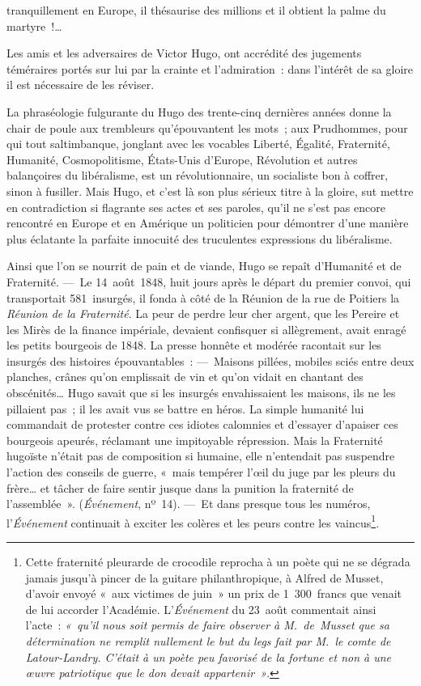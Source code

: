 \documentclass[french,twoside]{book} %
\begin{document}
\label{p39}tranquillement en Europe, il thésaurise des millions et il obtient la palme du martyre !…\par
Les amis et les adversaires de Victor Hugo, ont accrédité des jugements téméraires portés sur lui par la crainte et l’admiration : dans l’intérêt de sa gloire il est nécessaire de les réviser.\par
La phraséologie fulgurante du Hugo des trente-cinq dernières années donne la chair de poule aux trembleurs qu’épouvantent les mots ; aux Prudhommes, pour qui tout saltimbanque, jonglant avec les vocables Liberté, Égalité, Fraternité, Humanité, Cosmopolitisme, États-Unis d’Europe, Révolution et autres balançoires du libéralisme, est un révolutionnaire, un socialiste bon à coffrer, sinon à fusiller. Mais Hugo, et c’est là son plus sérieux titre à la gloire, sut mettre en contradiction si flagrante ses actes et ses paroles, qu’il ne s’est pas encore rencontré en Europe et en Amérique un politicien pour démontrer d’une manière plus éclatante la parfaite innocuité des truculentes expressions du libéralisme.\par
Ainsi que l’on se nourrit de pain et de viande, Hugo se repaît d’Humanité et de Fraternité. — Le 14 août 1848, huit jours après le départ du premier convoi, qui transportait 581 insurgés, il fonda à côté de la Réunion de la rue de Poitiers la {\itshape Réunion de la Fraternité}. La peur de perdre leur cher argent, que les Pereire et les Mirès de la finance impériale, devaient confisquer si allègrement, avait enragé les petits bourgeois de 1848. La presse honnête et modérée racontait sur les insurgés des histoires épouvantables : — Maisons pillées, mobiles sciés entre deux planches, crânes qu’on emplissait de vin  
\label{p40}et qu’on vidait en chantant des obscénités… Hugo savait que si les insurgés envahissaient les maisons, ils ne les pillaient pas ; il les avait vus se battre en héros. La simple humanité lui commandait de protester contre ces idiotes calomnies et d’essayer d’apaiser ces bourgeois apeurés, réclamant une impitoyable répression. Mais la Fraternité hugoïste n’était pas de composition si humaine, elle n’entendait pas suspendre l’action des conseils de guerre, « mais tempérer l’œil du juge par les pleurs du frère… et tâcher de faire sentir jusque dans la punition la fraternité de l’assemblée ». (\emph{Événement}, nº 14). — Et dans presque tous les numéros, l’\emph{Événement} continuait à exciter les colères et les peurs contre les vaincus\footnote{Cette fraternité pleurarde de crocodile reprocha à un poète qui ne se dégrada jamais jusqu’à pincer de la guitare philanthropique, à Alfred de Musset, d’avoir envoyé « aux victimes de juin » un prix de 1 300 francs que venait de lui accorder l’Académie. L’\emph{Événement} du 23 août commentait ainsi l’acte : \emph{« qu’il nous soit permis de faire observer à M. de Musset que sa détermination ne remplit nullement le but du legs fait par M. le comte de Latour-Landry. C’était à un poète peu favorisé de la fortune et non à une œuvre patriotique que le don devait appartenir »}.}.\par
\end{document}
